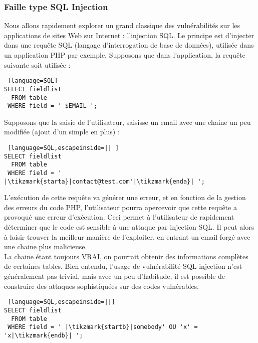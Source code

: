 \subsubsection{Faille type SQL Injection}

Nous allons rapidement explorer un grand classique des vulnérabilités sur les applications de sites Web sur Internet : l'injection SQL. Le principe est d'injecter dans une requête SQL (langage d'interrogation de base de données), utilisée dans un application PHP par exemple. Supposons que dans l'application, la requête suivante soit utilisée : \\
\begin{lstlisting} [language=SQL]
SELECT fieldlist
  FROM table 
 WHERE field = ' $EMAIL ';
\end{lstlisting}
Supposons que la saisie de l'utilisateur, saisisse un email avec une chaine un peu modifiée (ajout d'un simple  en plus)  :
\\
\begin{lstlisting} [language=SQL,escapeinside=|| ]
SELECT fieldlist
  FROM table 
 WHERE field = '  |\tikzmark{starta}|contact@test.com'|\tikzmark{enda}| ';
\end{lstlisting}


L'exécution de cette requête va générer une erreur, et en fonction de la gestion des erreurs du code PHP, l'utilisateur pourra apercevoir que cette requête a provoqué une erreur d'exécution. Ceci permet à l'utilisateur de rapidement déterminer que le code est sensible à une attaque par injection SQL. Il peut alors à loisir trouver la meilleur manière de l'exploiter, en entrant un email forgé avec une chaine plus malicieuse.\\

La chaine   étant toujours VRAI, on pourrait obtenir des informations complètes de certaines tables.
Bien entendu, l'usage de vulnérabilité SQL injection n'est généralement pas trivial, mais avec un peu d'habitude, il est possible de construire des attaques sophistiquées sur des codes vulnérables.\\
\begin{lstlisting} [language=SQL,escapeinside=||]
SELECT fieldlist
  FROM table 
 WHERE field = ' |\tikzmark{startb}|somebody' OU 'x' = 'x|\tikzmark{endb}| ';
\end{lstlisting}


